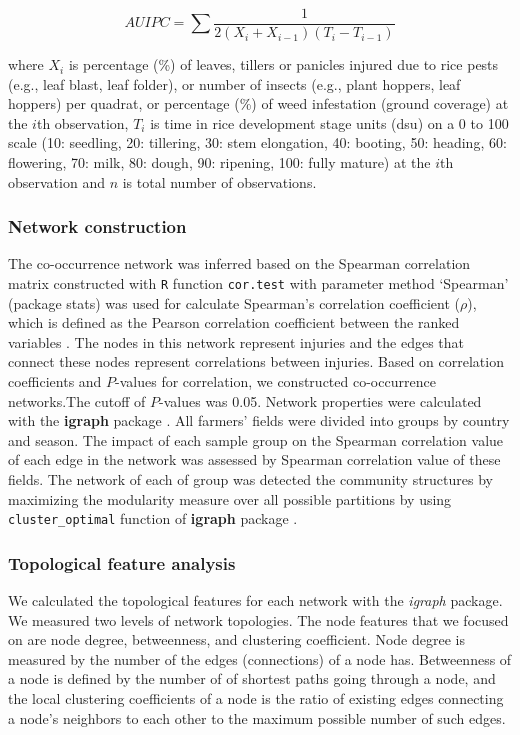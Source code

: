 \begin{equation}
AUIPC = \sum{\frac{1}{2(X_{i} + X_{i-1})(T_{i} - T_{i-1})}}
\end{equation}


where $X_i$ is percentage (\%) of leaves, tillers or panicles injured due to rice pests (e.g., leaf blast, leaf folder), or number of insects (e.g., plant hoppers, leaf hoppers) per quadrat, or percentage (\%) of weed infestation (ground coverage) at the $i$th observation, $T_i$ is time in rice development stage units (dsu) on a 0 to 100 scale (10: seedling, 20: tillering, 30: stem elongation, 40: booting, 50: heading, 60: flowering, 70: milk, 80: dough, 90: ripening, 100: fully mature) at the $i$th observation and $n$ is total number of observations.

\subsubsection{Network construction}

The co-occurrence network was inferred based on the Spearman correlation matrix constructed with \texttt{R} function \texttt{cor.test} with parameter method `Spearman' (package stats) was used for calculate Spearman's correlation coefficient ($\rho$), which is defined as the Pearson correlation coefficient between the ranked variables \cite{R_2015}. The nodes in this network represent injuries and the edges that connect these nodes represent correlations between injuries. Based on correlation coefficients and $P$-values for correlation, we constructed co-occurrence networks.The cutoff of $P$-values was 0.05. Network properties were calculated with the \textbf{igraph} package \citep{Csardi_2010_igraph}. All farmers' fields were divided into groups by country and season. The impact of each sample group on the Spearman correlation value of each edge in the network was assessed by Spearman correlation value of these fields. The network of each of group was detected the community structures by maximizing the modularity measure over all possible partitions by using \texttt{cluster\_optimal} function of \textbf{igraph} package \cite{Brandes_2008_Modularity}.


\subsubsection{Topological feature analysis}

We calculated the topological features for each network with the \textit{igraph} package. We measured two levels of network topologies. The node features that we focused on are node degree, betweenness, and clustering coefficient. Node degree is measured by the number of the edges (connections) of a node has. Betweenness of a node is defined by the number of of shortest paths going through a node, and the local clustering coefficients of a node is the ratio of existing edges connecting a node's neighbors to each other to the maximum possible number of such edges.

